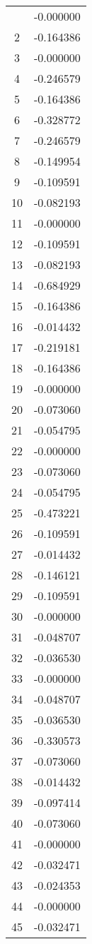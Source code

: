 \documentclass[12pt]{article}
\begin{document}
\begin{longtable}{@{}cc@{}}
\bottomrule
\endlastfoot
1 & -0.000000 \\
2 & -0.164386 \\
3 & -0.000000 \\
4 & -0.246579 \\
5 & -0.164386 \\
6 & -0.328772 \\
7 & -0.246579 \\
8 & -0.149954 \\
9 & -0.109591 \\
10 & -0.082193 \\
11 & -0.000000 \\
12 & -0.109591 \\
13 & -0.082193 \\
14 & -0.684929 \\
15 & -0.164386 \\
16 & -0.014432 \\
17 & -0.219181 \\
18 & -0.164386 \\
19 & -0.000000 \\
20 & -0.073060 \\
21 & -0.054795 \\
22 & -0.000000 \\
23 & -0.073060 \\
24 & -0.054795 \\
25 & -0.473221 \\
26 & -0.109591 \\
27 & -0.014432 \\
28 & -0.146121 \\
29 & -0.109591 \\
30 & -0.000000 \\
31 & -0.048707 \\
32 & -0.036530 \\
33 & -0.000000 \\
34 & -0.048707 \\
35 & -0.036530 \\
36 & -0.330573 \\
37 & -0.073060 \\
38 & -0.014432 \\
39 & -0.097414 \\
40 & -0.073060 \\
41 & -0.000000 \\
42 & -0.032471 \\
43 & -0.024353 \\
44 & -0.000000 \\
45 & -0.032471 \\

\end{longtable}
\end{document}

